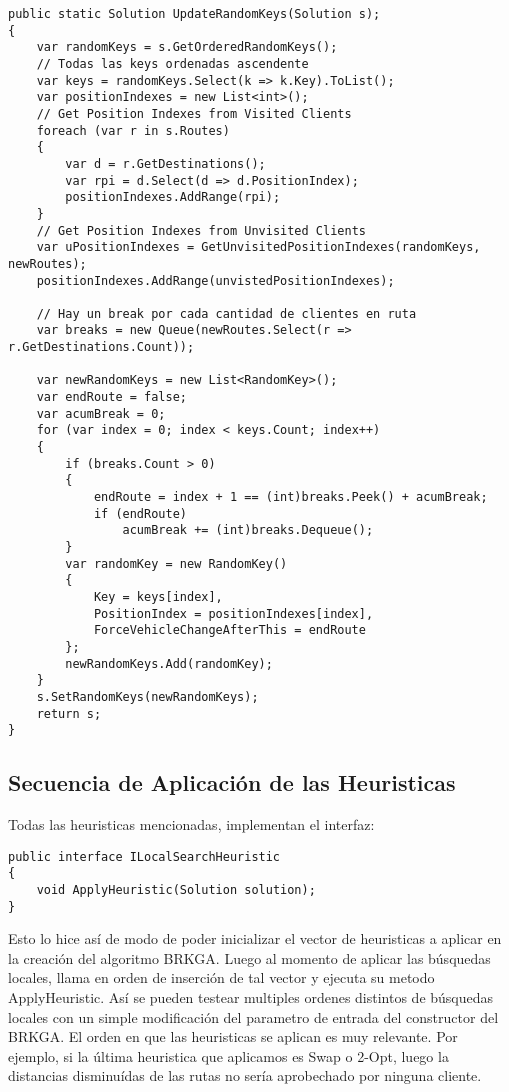 \begin{lstlisting}
public static Solution UpdateRandomKeys(Solution s);
{
	var randomKeys = s.GetOrderedRandomKeys();
	// Todas las keys ordenadas ascendente
	var keys = randomKeys.Select(k => k.Key).ToList();
	var positionIndexes = new List<int>();
	// Get Position Indexes from Visited Clients
	foreach (var r in s.Routes)
	{
		var d = r.GetDestinations();
		var rpi = d.Select(d => d.PositionIndex);
		positionIndexes.AddRange(rpi);
	}
	// Get Position Indexes from Unvisited Clients
	var uPositionIndexes = GetUnvisitedPositionIndexes(randomKeys, newRoutes);
	positionIndexes.AddRange(unvistedPositionIndexes);

	// Hay un break por cada cantidad de clientes en ruta 
	var breaks = new Queue(newRoutes.Select(r => r.GetDestinations.Count));

	var newRandomKeys = new List<RandomKey>();
	var endRoute = false;
	var acumBreak = 0;
	for (var index = 0; index < keys.Count; index++)
	{
		if (breaks.Count > 0)
		{		
			endRoute = index + 1 == (int)breaks.Peek() + acumBreak;
			if (endRoute)
				acumBreak += (int)breaks.Dequeue();
		}		
		var randomKey = new RandomKey()
		{
			Key = keys[index],
			PositionIndex = positionIndexes[index],
			ForceVehicleChangeAfterThis = endRoute
		};
		newRandomKeys.Add(randomKey);
	}
	s.SetRandomKeys(newRandomKeys);
	return s;
}
\end{lstlisting}

\subsection{Secuencia de Aplicación de las Heuristicas}

Todas las heuristicas mencionadas, implementan el interfaz:

\begin{lstlisting}
public interface ILocalSearchHeuristic
{
	void ApplyHeuristic(Solution solution);
}
\end{lstlisting}

Esto lo hice así de modo de poder inicializar el vector de heuristicas a aplicar en la creación del algoritmo BRKGA. Luego al momento de aplicar las búsquedas locales, llama en orden de inserción de tal vector y ejecuta su metodo ApplyHeuristic. Así se pueden testear multiples ordenes distintos de búsquedas locales con un simple modificación del parametro de entrada del constructor del BRKGA. El orden en que las heuristicas se aplican es muy relevante. Por ejemplo, si la última heuristica que aplicamos es Swap o 2-Opt, luego la distancias disminuídas de las rutas no sería aprobechado por ninguna cliente.

